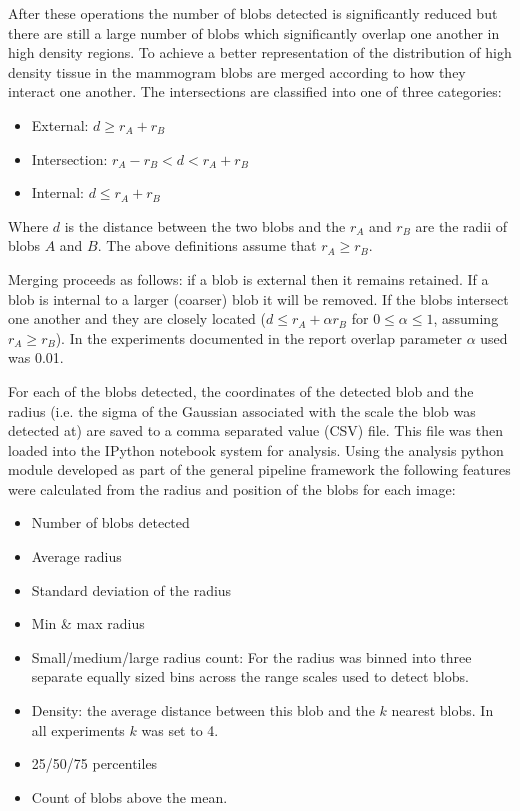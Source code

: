 After these operations the number of blobs detected is significantly reduced but there are still a large number of blobs which significantly overlap one another in high density regions. To achieve a better representation of the distribution of high density tissue in the mammogram blobs are merged according to how they interact one another. The intersections are classified into one of three categories:

\begin{itemize}
	\item External: $d \geq r_A + r_B$
	\item Intersection: $r_A - r_B < d < r_A + r_B$
	\item Internal: $d \leq r_A + r_B$
\end{itemize}

Where $d$ is the distance between the two blobs and the $r_A$ and $r_B$ are the radii of blobs $A$ and $B$. The above definitions assume that $r_A \geq r_B$.

Merging proceeds as follows: if a blob is external then it remains retained. If a blob is internal to a larger (coarser) blob it will be removed. If the blobs intersect one another and they are closely located ($d \leq r_A + \alpha r_B$ for $0 \leq \alpha \leq 1$, assuming $r_A \geq r_B$). In the experiments documented in the report overlap parameter $\alpha$ used was 0.01. 

For each of the blobs detected, the coordinates of the detected blob and the radius (i.e. the sigma of the Gaussian associated with the scale the blob was detected at) are saved to a comma separated value (CSV) file. This file was then loaded into the IPython notebook system for analysis. Using the analysis python module developed as part of the general pipeline framework the following features were calculated from the radius and position of the blobs for each image:

\begin{itemize}
	\item Number of blobs detected
	\item Average radius
	\item Standard deviation of the radius
	\item Min \& max radius
	\item Small/medium/large radius count: For the radius was binned into three separate equally sized bins across the range scales used to detect blobs.
	\item Density: the average distance between this blob and the $k$ nearest blobs. In all experiments $k$ was set to 4.
	\item 25/50/75 percentiles
	\item Count of blobs above the mean.
\end{itemize}


